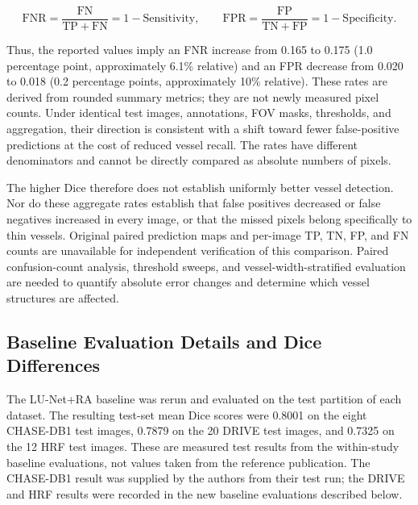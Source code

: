 \documentclass[jimaging,article,submit,pdftex,moreauthors]{Definitions/mdpi}%
\begin{document}
\begin{equation}
\mathrm{FNR}=\frac{\mathrm{FN}}{\mathrm{TP}+\mathrm{FN}}=1-\mathrm{Sensitivity},\qquad
\mathrm{FPR}=\frac{\mathrm{FP}}{\mathrm{TN}+\mathrm{FP}}=1-\mathrm{Specificity}.
\end{equation}

Thus, the reported values imply an FNR increase from 0.165 to 0.175 (1.0 percentage point, approximately 6.1\% relative) and an FPR decrease from 0.020 to 0.018 (0.2 percentage points, approximately 10\% relative). These rates are derived from rounded summary metrics; they are not newly measured pixel counts. Under identical test images, annotations, FOV masks, thresholds, and aggregation, their direction is consistent with a shift toward fewer false-positive predictions at the cost of reduced vessel recall. The rates have different denominators and cannot be directly compared as absolute numbers of pixels.



The higher Dice therefore does not establish uniformly better vessel detection. Nor do these aggregate rates establish that false positives decreased or false negatives increased in every image, or that the missed pixels belong specifically to thin vessels. Original paired prediction maps and per-image TP, TN, FP, and FN counts are unavailable for independent verification of this comparison. Paired confusion-count analysis, threshold sweeps, and vessel-width-stratified evaluation are needed to quantify absolute error changes and determine which vessel structures are affected.



\subsection{Baseline Evaluation Details and Dice Differences}



The LU-Net+RA baseline was rerun and evaluated on the test partition of each dataset. The resulting test-set mean Dice scores were 0.8001 on the eight CHASE-DB1 test images, 0.7879 on the 20 DRIVE test images, and 0.7325 on the 12 HRF test images. These are measured test results from the within-study baseline evaluations, not values taken from the reference publication. The CHASE-DB1 result was supplied by the authors from their test run; the DRIVE and HRF results were recorded in the new baseline evaluations described below.
\end{document}
